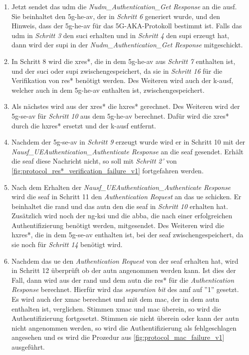 \begin{enumerate}
\item Jetzt sendet das \gls{udm} die \textit{Nudm\_Authentication\_Get Response} an die \gls{ausf}.
Sie beinhaltet den \gls{5g-he-av}, der in \textit{Schritt 6} generiert wurde, und den Hinweis, dass der \gls{5g-he-av} für das 5G-AKA-Protokoll bestimmt ist.
Falls das \gls{udm} in \textit{Schritt 3} den \gls{suci} erhalten und in \textit{Schritt 4} den \gls{supi} erzeugt hat, dann wird der \gls{supi} in der \textit{Nudm\_Authentication\_Get Response} mitgeschickt.

\item In Schritt 8 wird die \gls{xres*}, die in dem \gls{5g-he-av} aus \textit{Schritt 7} enthalten ist, und der \gls{suci} oder \gls{supi} zwischengespeichert, da sie in \textit{Schritt 16} für die Verifikation von \gls{res*} benötigt werden.
Des Weiteren wird auch der \gls{k-ausf}, welcher auch in dem \gls{5g-he-av} enthalten ist, zwischengespeichert.

\item Als nächstes wird aus der \gls{xres*} die \gls{hxres*} gerechnet.
Des Weiteren wird der \gls{5g-se-av} für \textit{Schritt 10} aus dem \gls{5g-he-av} berechnet.
Dafür wird die \gls{xres*} durch die \gls{hxres*} ersetzt und der \gls{k-ausf} entfernt.

\item Nachdem der \gls{5g-se-av} in \textit{Schritt 9} erzeugt wurde wird er in Schritt 10 mit der \textit{Nausf\_UEAuthentication\_Authenticate Response} an die \gls{seaf} gesendet.
Erhält die \gls{seaf} diese Nachricht nicht, so soll mit \textit{Schritt 2'} von \cref{fig:protocol_res*_verification_failure_v1} fortgefahren werden.

\item Nach dem Erhalten der \textit{Nausf\_UEAuthentication\_Authenticate Response} wird die \gls{seaf} in Schritt 11 den \textit{Authentication Request}  an das \gls{ue} schicken.
Er beinhaltet die \gls{rand} und das \gls{autn} den die \gls{seaf} in \textit{Schritt 10} erhalten hat.
Zusätzlich wird noch der \gls{ng-ksi} und die \gls{abba}, die nach einer erfolgreichen Authentifizierung benötigt werden, mitgesendet.
Des Weiteren wird die \gls{hxres*}, die in dem \gls{5g-se-av} enthalten ist, bei der \gls{seaf} zwischengespeichert, da sie noch für \textit{Schritt 14} benötigt wird.

\item Nachdem das \gls{ue} den \textit{Authentication Request} von der \gls{seaf} erhalten hat, wird in Schritt 12 überprüft ob der \gls{autn} angenommen werden kann.
Ist dies der Fall, dann wird aus der \gls{rand} und dem \gls{autn} die \gls{res*} für die \textit{Authentication Response} berechnet.
Hierfür wird das \textit{separation bit} des \gls{amf} auf ''1'' gesetzt.
Es wird auch der \gls{xmac} berechnet und mit dem \gls{mac}, der in dem \gls{autn} enthalten ist, verglichen.
Stimmen \gls{xmac} und \gls{mac} überein, so wird die Authentifizierung fortgesetzt.
Stimmen sie nicht überein oder kann der \gls{autn} nicht angenommen werden, so wird die Authentifizierung als fehlgeschlagen angesehen und es wird die Prozedur aus \cref{fig:protocol_mac_failure_v1} ausgeführt.


\end{enumerate}
